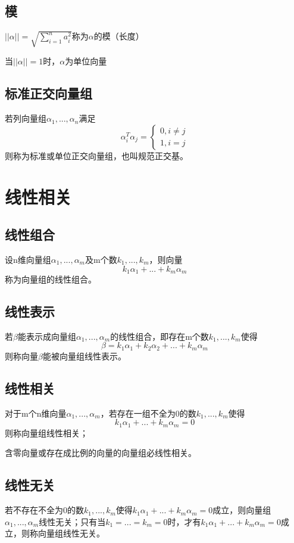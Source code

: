 \subsection{模}
\(||\alpha|| = \displaystyle \sqrt{\sum_{i = 1}^{n}a_i^2}\)称为\(\alpha\)的模（长度）

当\(||\alpha|| = 1\)时，\(\alpha\)为单位向量


\subsection{标准正交向量组}
若列向量组\(\alpha_1, ..., \alpha_n\)满足\[\alpha_i^T\alpha_j = 
\begin{cases}
0, i \neq j \\ 
1, i = j
\end{cases}
\]则称为标准或单位正交向量组，也叫规范正交基。


\section{线性相关}

\subsection{线性组合}
设n维向量组\(\alpha_1, ..., \alpha_m\)及m个数\(k_1, ..., k_m\)，则向量\[k_1\alpha_1 + ... + k_m\alpha_m\]
称为向量组的线性组合。


\subsection{线性表示}
若\(\beta\)能表示成向量组\(\alpha_1, ..., \alpha_m\)的线性组合，即存在m个数\(k_1, ..., k_m\)使得\[\beta = k_1\alpha_1 + k_2\alpha_2 + ... + k_m\alpha_m\]则称向量\(\beta\)能被向量组线性表示。


\subsection{线性相关}
对于m个n维向量\(\alpha_1, ..., \alpha_m\)，若存在一组不全为0的数\(k_1, ..., k_m\)使得\[k_1\alpha_1 + ... + k_m\alpha_m = 0\]则称向量组线性相关；

含零向量或存在成比例的向量的向量组必线性相关。


\subsection{线性无关}
若不存在不全为0的数\(k_1, ..., k_m\)使得\(k_1\alpha_1 + ... + k_m\alpha_m = 0\)成立，则向量组\(\alpha_1, ..., \alpha_m\)线性无关；只有当\(k_1 = ... =k_m = 0\)时，才有\(k_1\alpha_1 + ... + k_m\alpha_m = 0\)成立，则称向量组线性无关。

